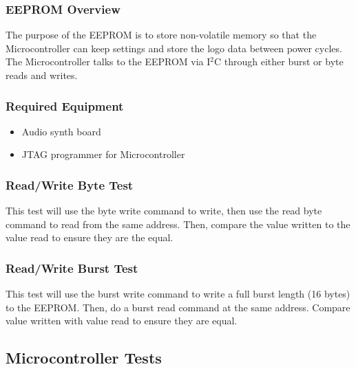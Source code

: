 \documentclass{article}
\begin{document}
\subsubsection{EEPROM Overview}
The purpose of the EEPROM is to store non-volatile memory so that the Microcontroller can keep settings and store the logo data between power cycles. The Microcontroller talks to the EEPROM via I$^2$C through either burst or byte reads and writes.
\subsubsection{Required Equipment}
\begin{itemize}
\item Audio synth board
\item JTAG programmer for Microcontroller
\end{itemize}
\subsubsection{Read/Write Byte Test}
This test will use the byte write command to write, then use the read byte command to read from the same address. Then, compare the value written to the value read to ensure they are the equal.
\subsubsection{Read/Write Burst Test}
This test will use the burst write command to write a full burst length (16 bytes) to the EEPROM. Then, do a burst read command at the same address. Compare value written with value read to ensure they are equal.

\subsection{Microcontroller Tests}
\end{document}
